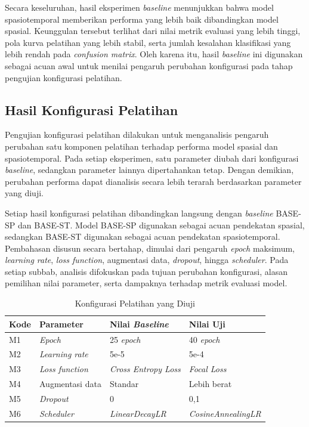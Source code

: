 Secara keseluruhan, hasil eksperimen \textit{baseline} menunjukkan bahwa model spasiotemporal memberikan performa yang lebih baik dibandingkan model spasial. Keunggulan tersebut terlihat dari nilai metrik evaluasi yang lebih tinggi, pola kurva pelatihan yang lebih stabil, serta jumlah kesalahan klasifikasi yang lebih rendah pada \textit{confusion matrix}. Oleh karena itu, hasil \textit{baseline} ini digunakan sebagai acuan awal untuk menilai pengaruh perubahan konfigurasi pada tahap pengujian konfigurasi pelatihan.

\subsection{Hasil Konfigurasi Pelatihan} \label{IV.Eksperimen_Ablation}
Pengujian konfigurasi pelatihan dilakukan untuk menganalisis pengaruh perubahan satu komponen pelatihan terhadap performa model spasial dan spasiotemporal. Pada setiap eksperimen, satu parameter diubah dari konfigurasi \textit{baseline}, sedangkan parameter lainnya dipertahankan tetap. Dengan demikian, perubahan performa dapat dianalisis secara lebih terarah berdasarkan parameter yang diuji.

Setiap hasil konfigurasi pelatihan dibandingkan langsung dengan \textit{baseline} BASE-SP dan BASE-ST. Model BASE-SP digunakan sebagai acuan pendekatan spasial, sedangkan BASE-ST digunakan sebagai acuan pendekatan spasiotemporal. Pembahasan disusun secara bertahap, dimulai dari pengaruh \textit{epoch} maksimum, \textit{learning rate}, \textit{loss function}, augmentasi data, \textit{dropout}, hingga \textit{scheduler}. Pada setiap subbab, analisis difokuskan pada tujuan perubahan konfigurasi, alasan pemilihan nilai parameter, serta dampaknya terhadap metrik evaluasi model.

\begin{table}[htbp]
\centering
\caption{Konfigurasi Pelatihan yang Diuji}
\label{table:4.ablation-config}
\begin{tabular}{llll}
\toprule
\textbf{Kode} &
\textbf{Parameter} &
\textbf{Nilai \textit{Baseline}} &
\textbf{Nilai Uji} \\
\midrule
M1 & \textit{Epoch} & 25 \textit{epoch} & 40 \textit{epoch} \\
M2 & \textit{Learning rate} & 5e-5 & 5e-4 \\
M3 & \textit{Loss function} & \textit{Cross Entropy Loss} & \textit{Focal Loss} \\
M4 & Augmentasi data & Standar & Lebih berat \\
M5 & \textit{Dropout} & 0 & 0,1 \\
M6 & \textit{Scheduler} & \textit{LinearDecayLR} & \textit{CosineAnnealingLR} \\
\bottomrule
\end{tabular}
\end{table}

